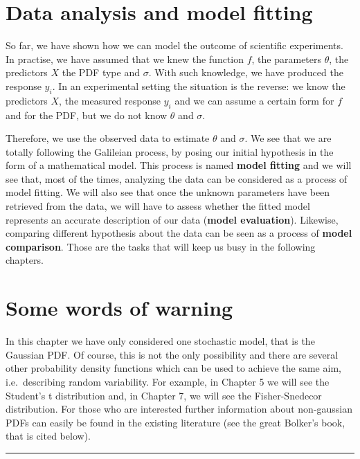 \documentclass[a4paper,12pt,oneside]{book}
\begin{document}
\hypertarget{data-analysis-and-model-fitting}{%
\section{Data analysis and model fitting}\label{data-analysis-and-model-fitting}}

So far, we have shown how we can model the outcome of scientific experiments. In practise, we have assumed that we knew the function \(f\), the parameters \(\theta\), the predictors \(X\) the PDF type and \(\sigma\). With such knowledge, we have produced the response \(y_i\). In an experimental setting the situation is the reverse: we know the predictors \(X\), the measured response \(y_i\) and we can assume a certain form for \(f\) and for the PDF, but we do not know \(\theta\) and \(\sigma\).

Therefore, we use the observed data to estimate \(\theta\) and \(\sigma\). We see that we are totally following the Galileian process, by posing our initial hypothesis in the form of a mathematical model. This process is named \textbf{model fitting} and we will see that, most of the times, analyzing the data can be considered as a process of model fitting. We will also see that once the unknown parameters have been retrieved from the data, we will have to assess whether the fitted model represents an accurate description of our data (\textbf{model evaluation}). Likewise, comparing different hypothesis about the data can be seen as a process of \textbf{model comparison}. Those are the tasks that will keep us busy in the following chapters.

\hypertarget{some-words-of-warning}{%
\section{Some words of warning}\label{some-words-of-warning}}

In this chapter we have only considered one stochastic model, that is the Gaussian PDF. Of course, this is not the only possibility and there are several other probability density functions which can be used to achieve the same aim, i.e.~describing random variability. For example, in Chapter 5 we will see the Student's t distribution and, in Chapter 7, we will see the Fisher-Snedecor distribution. For those who are interested further information about non-gaussian PDFs can easily be found in the existing literature (see the great Bolker's book, that is cited below).

\begin{center}\rule{0.5\linewidth}{0.5pt}\end{center}
\end{document}
